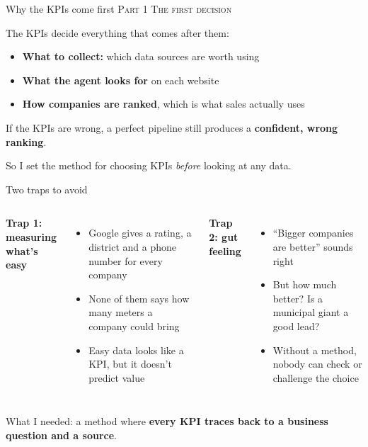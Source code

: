 \documentclass[aspectratio=169,11pt]{beamer}
\newcommand{\partlabel}[1]{{\small\color{assume}\textsc{#1}}\par\vspace{0.3em}}
\begin{document}
\begin{frame}{Why the KPIs come first}
  \partlabel{Part 1\textbullet{} The first decision}
  The KPIs decide everything that comes after them:
  \begin{itemize}
    \item \textbf{What to collect:} which data sources are worth using
    \item \textbf{What the agent looks for} on each website
    \item \textbf{How companies are ranked}, which is what sales actually uses
  \end{itemize}
  \vspace{0.8em}
  If the KPIs are wrong, a perfect pipeline still produces a \textbf{confident, wrong ranking}.
  \vspace{0.8em}

  So I set the method for choosing KPIs \emph{before} looking at any data.
\end{frame}

\begin{frame}{Two traps to avoid}
  \begin{columns}[T]
    \textbf{Trap 1: measuring what's easy}
    \begin{itemize}
      \item Google gives a rating, a district and a phone number for every company
      \item None of them says how many meters a company could bring
      \item Easy data looks like a KPI, but it doesn't predict value
    \end{itemize}
    \textbf{Trap 2: gut feeling}
    \begin{itemize}
      \item ``Bigger companies are better'' sounds right
      \item But how much better? Is a municipal giant a good lead?
      \item Without a method, nobody can check or challenge the choice
    \end{itemize}
  \end{columns}
  \vspace{1em}
  What I needed: a method where \textbf{every KPI traces back to a business question and
  a source}.
\end{frame}
\end{document}
